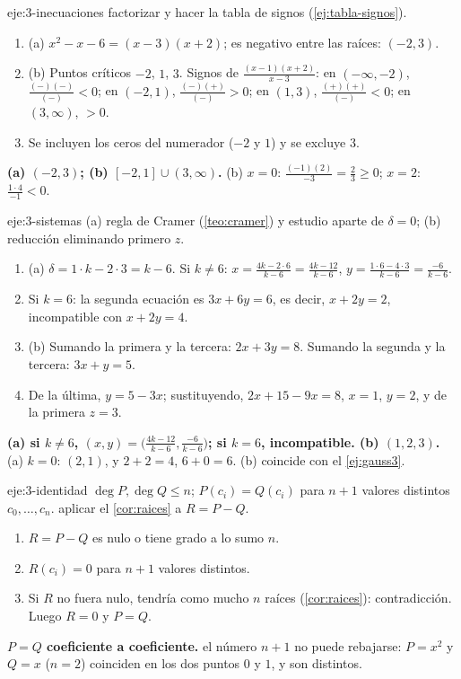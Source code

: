 \begin{solucion}{eje:3-inecuaciones}
\planteamiento factorizar y hacer la tabla de signos (\cref{ej:tabla-signos}).
\pasos
\begin{enumerate}[label=\arabic*.]
  \item (a) $x^2-x-6=(x-3)(x+2)$; es negativo entre las raíces: $(-2,3)$.
  \item (b) Puntos críticos $-2$, $1$, $3$. Signos de $\frac{(x-1)(x+2)}{x-3}$: en $(-\infty,-2)$, $\frac{(-)(-)}{(-)}<0$; en $(-2,1)$, $\frac{(-)(+)}{(-)}>0$; en $(1,3)$, $\frac{(+)(+)}{(-)}<0$; en $(3,\infty)$, $>0$.
  \item Se incluyen los ceros del numerador ($-2$ y $1$) y se excluye $3$.
\end{enumerate}
\resultado \textbf{(a) $(-2,3)$; (b) $[-2,1]\cup(3,\infty)$.}
\comprobacion (b) $x=0$: $\frac{(-1)(2)}{-3}=\frac23\ge0$; $x=2$: $\frac{1\cdot4}{-1}<0$.
\end{solucion}

\begin{solucion}{eje:3-sistemas}
\planteamiento (a) regla de Cramer (\cref{teo:cramer}) y estudio aparte de $\delta=0$; (b) reducción eliminando primero $z$.
\pasos
\begin{enumerate}[label=\arabic*.]
  \item (a) $\delta=1\cdot k-2\cdot3=k-6$. Si $k\neq6$: $x=\frac{4k-2\cdot6}{k-6}=\frac{4k-12}{k-6}$, $y=\frac{1\cdot6-4\cdot3}{k-6}=\frac{-6}{k-6}$.
  \item Si $k=6$: la segunda ecuación es $3x+6y=6$, es decir, $x+2y=2$, incompatible con $x+2y=4$.
  \item (b) Sumando la primera y la tercera: $2x+3y=8$. Sumando la segunda y la tercera: $3x+y=5$.
  \item De la última, $y=5-3x$; sustituyendo, $2x+15-9x=8$, $x=1$, $y=2$, y de la primera $z=3$.
\end{enumerate}
\resultado \textbf{(a) si $k\neq6$, $(x,y)=\bigl(\frac{4k-12}{k-6},\frac{-6}{k-6}\bigr)$; si $k=6$, incompatible. (b) $(1,2,3)$.}
\comprobacion (a) $k=0$: $(2,1)$, y $2+2=4$, $6+0=6$. (b) coincide con el \cref{ej:gauss3}.
\end{solucion}

\begin{solucion}{eje:3-identidad}
\datos $\deg P,\deg Q\le n$; $P(c_i)=Q(c_i)$ para $n+1$ valores distintos $c_0,\dots,c_n$.
\planteamiento aplicar el \cref{cor:raices} a $R=P-Q$.
\pasos
\begin{enumerate}[label=\arabic*.]
  \item $R=P-Q$ es nulo o tiene grado a lo sumo $n$.
  \item $R(c_i)=0$ para $n+1$ valores distintos.
  \item Si $R$ no fuera nulo, tendría como mucho $n$ raíces (\cref{cor:raices}): contradicción. Luego $R=0$ y $P=Q$.
\end{enumerate}
\resultado \textbf{$P=Q$ coeficiente a coeficiente.}
\comprobacion el número $n+1$ no puede rebajarse: $P=x^2$ y $Q=x$ ($n=2$) coinciden en los dos puntos $0$ y $1$, y son distintos.
\end{solucion}

